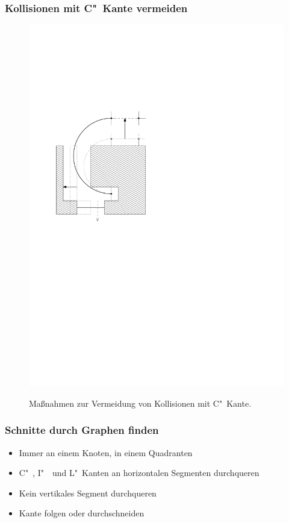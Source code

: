 \documentclass{beamer}
\begin{document}
\begin{frame}
  \frametitle{Kollisionen mit C"~Kante vermeiden}
 \begin{figure}[h]
        \centering
            {\includegraphics[width=.5\textwidth]{accomodate_C_edge}}
        \caption{Maßnahmen zur Vermeidung von Kollisionen mit C"~Kante.}
\end{figure}
\end{frame}


\begin{frame}
  \frametitle{Schnitte durch Graphen finden}
  \begin{itemize}[<+->]
    \item Immer an einem Knoten, in einem Quadranten
    \item C"~, I"~~und L"~Kanten an horizontalen Segmenten durchqueren
    \item Kein vertikales Segment durchqueren
    \item Kante folgen oder durchschneiden
  \end{itemize}
\end{frame}




\end{document}
